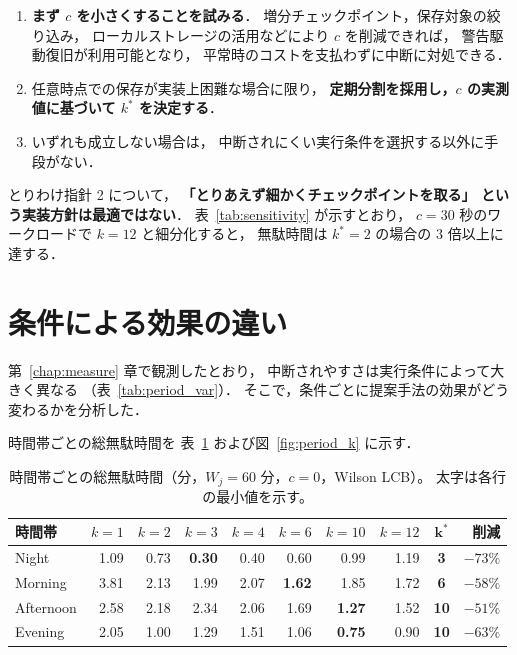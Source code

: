 \documentclass[11pt,a4paper]{ltjsreport}
\begin{document}
\begin{enumerate}
  \item \textbf{まず $c$ を小さくすることを試みる}．
        増分チェックポイント，保存対象の絞り込み，
        ローカルストレージの活用などにより $c$ を削減できれば，
        警告駆動復旧が利用可能となり，
        平常時のコストを支払わずに中断に対処できる．
  \item 任意時点での保存が実装上困難な場合に限り，
        \textbf{定期分割を採用し，$c$ の実測値に基づいて
        $k^{*}$ を決定する}．
  \item いずれも成立しない場合は，
        中断されにくい実行条件を選択する以外に手段がない．
\end{enumerate}

とりわけ指針 2 について，
\textbf{「とりあえず細かくチェックポイントを取る」
という実装方針は最適ではない}．
表~\ref{tab:sensitivity} が示すとおり，
$c = 30$ 秒のワークロードで $k = 12$ と細分化すると，
無駄時間は $k^{*} = 2$ の場合の $3$ 倍以上に達する．

\section{条件による効果の違い}
\label{sec:condition}

第~\ref{chap:measure} 章で観測したとおり，
中断されやすさは実行条件によって大きく異なる
（表~\ref{tab:period_var}）．
そこで，条件ごとに提案手法の効果がどう変わるかを分析した．

時間帯ごとの総無駄時間を
表~\ref{tab:period_k} および図~\ref{fig:period_k} に示す．

\begin{table}[htbp]
\centering
\caption{時間帯ごとの総無駄時間（分，$W_j = 60$ 分，$c=0$，Wilson LCB）。
太字は各行の最小値を示す。}
\label{tab:period_k}
\small
\begin{tabular}{@{}lrrrrrrrcr@{}}
\toprule
時間帯 & $k{=}1$ & $k{=}2$ & $k{=}3$ & $k{=}4$ & $k{=}6$ & $k{=}10$ & $k{=}12$
 & $\mathbf{k^{*}}$ & 削減 \\
\midrule
Night     & 1.09 & 0.73 & \textbf{0.30} & 0.40 & 0.60 & 0.99 & 1.19
 & \textbf{3}  & $-73\%$ \\
Morning   & 3.81 & 2.13 & 1.99 & 2.07 & \textbf{1.62} & 1.85 & 1.72
 & \textbf{6}  & $-58\%$ \\
Afternoon & 2.58 & 2.18 & 2.34 & 2.06 & 1.69 & \textbf{1.27} & 1.52
 & \textbf{10} & $-51\%$ \\
Evening   & 2.05 & 1.00 & 1.29 & 1.51 & 1.06 & \textbf{0.75} & 0.90
 & \textbf{10} & $-63\%$ \\
\bottomrule
\end{tabular}
\end{table}
\end{document}
